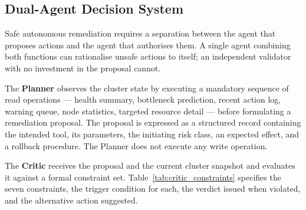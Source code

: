 \documentclass[12pt,a4paper]{report}
\begin{document}
\subsection{Dual-Agent Decision System}

Safe autonomous remediation requires a separation between the agent that proposes
actions and the agent that authorises them. A single agent combining both functions
can rationalise unsafe actions to itself; an independent validator with no investment
in the proposal cannot.

The \textbf{Planner} observes the cluster state by executing a mandatory sequence of
read operations --- health summary, bottleneck prediction, recent action log, warning
queue, node statistics, targeted resource detail --- before formulating a remediation
proposal. The proposal is expressed as a structured record containing the intended
tool, its parameters, the initiating risk class, an expected effect, and a rollback
procedure. The Planner does not execute any write operation.

The \textbf{Critic} receives the proposal and the current cluster snapshot and
evaluates it against a formal constraint set. Table~\ref{tab:critic_constraints}
specifies the seven constraints, the trigger condition for each, the verdict issued
when violated, and the alternative action suggested.
\end{document}
